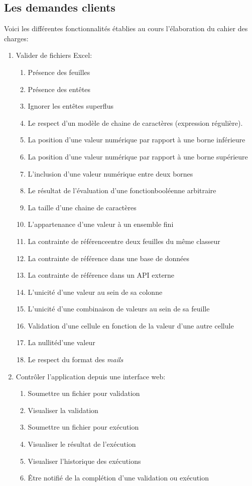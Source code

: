 \subsection{Les demandes clients}
\label{subsec:customer-requests}

Voici les différentes fonctionnalités établies au cours l'élaboration du cahier des charges:
\begin{enumerate}
    \item Valider de fichiers Excel:
    \begin{enumerate}
        \item Présence des feuilles
        \item Présence des entêtes
        \item Ignorer les entêtes superflus
        \item Le respect d'un modèle de chaine de caractères (expression régulière\fnmark).
        \item La position d'une valeur numérique par rapport à une borne inférieure
        \item La position d'une valeur numérique par rapport à une borne supérieure
        \item L'inclusion d'une valeur numérique entre deux bornes
        \item Le résultat de l'évaluation d'une fonction\fnmark booléenne arbitraire
        \item La taille d'une chaine de caractères
        \item L'appartenance d'une valeur à un ensemble fini
        \item La contrainte de référence\fnmark entre deux feuilles du même classeur
        \item La contrainte de référence dans une base de données
        \item La contrainte de référence dans un API externe
        \item L'unicité d'une valeur au sein de sa colonne
        \item L'unicité d'une combinaison de valeurs au sein de sa feuille
        \item Validation d'une cellule en fonction de la valeur d'une autre cellule
        \item La nullité\fnmark d'une valeur
        \item Le respect du format des \textit{mails}
    \end{enumerate}
    \item Contrôler l'application depuis une interface web:
    \begin{enumerate}
        \item Soumettre un fichier pour validation
        \item Visualiser la validation
        \item Soumettre un fichier pour exécution
        \item Visualiser le résultat de l'exécution
        \item Visualiser l'historique des exécutions
        \item Être notifié de la complétion d'une validation ou exécution
    \end{enumerate}
\end{enumerate}
    
